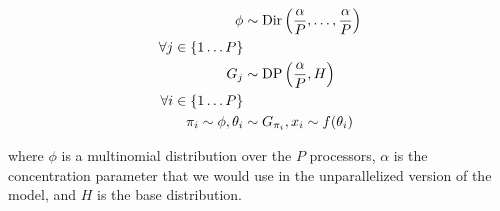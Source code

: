 \begin{align*}
    \phi &\sim \mathrm{Dir}\left(\frac{\alpha}{P}, \ldots, \frac{\alpha}{P}\right) \\
    \forall j \in \{1 \ldots P\} & \\
    G_j &\sim \mathrm{DP}\left(\frac{\alpha}{P}, H\right) \\
    \forall i \in \{1 \ldots P\} & \\
    \pi_i \sim \phi,
    \theta_i &\sim G_{\pi_i},
    x_i \sim f(\theta_i)
\end{align*}

where $\phi$ is a multinomial distribution over the $P$ processors,
$\alpha$ is the concentration parameter that we would use in the
unparallelized version of the model, and $H$ is the base distribution.
